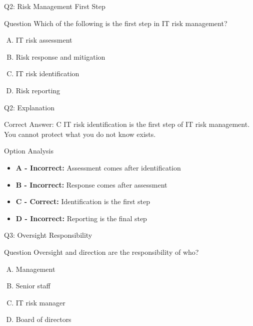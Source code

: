 \documentclass{beamer}
\begin{document}
	
	\begin{frame}{Q2: Risk Management First Step}
		\begin{block}{Question}
			Which of the following is the first step in IT risk management?
		\end{block}
		\begin{enumerate}[(A)]
			\item IT risk assessment
			\item Risk response and mitigation
			\item IT risk identification
			\item Risk reporting
		\end{enumerate}
	\end{frame}
	
	\begin{frame}{Q2: Explanation}
		\begin{block}{Correct Answer: C}
			IT risk identification is the first step of IT risk management. You cannot protect what you do not know exists.
		\end{block}
		\begin{block}{Option Analysis}
			\begin{itemize}
				\item \textbf{A - Incorrect:} Assessment comes after identification
				\item \textbf{B - Incorrect:} Response comes after assessment
				\item \textbf{C - Correct:} Identification is the first step
				\item \textbf{D - Incorrect:} Reporting is the final step
			\end{itemize}
		\end{block}
	\end{frame}
	
	\begin{frame}{Q3: Oversight Responsibility}
		\begin{block}{Question}
			Oversight and direction are the responsibility of who?
		\end{block}
		\begin{enumerate}[(A)]
			\item Management
			\item Senior staff
			\item IT risk manager
			\item Board of directors
		\end{enumerate}
	\end{frame}
	
\end{document}
